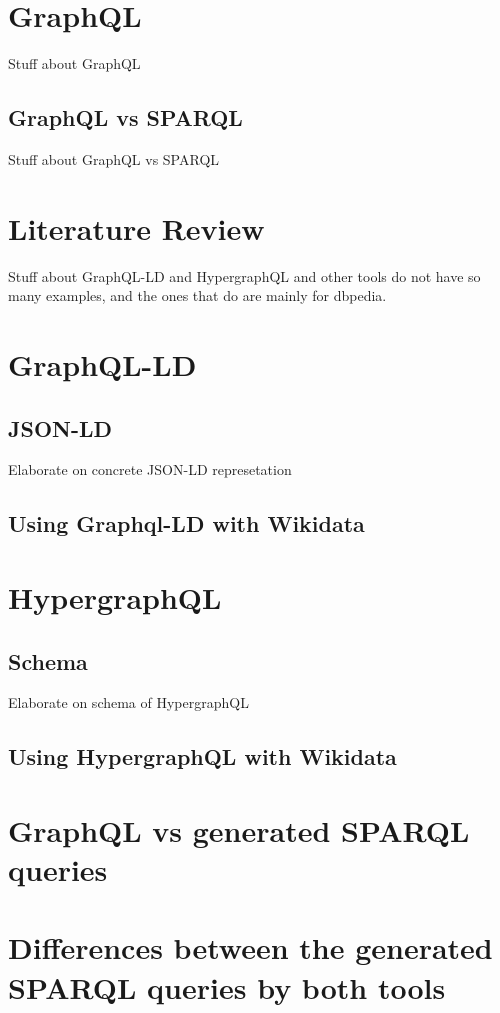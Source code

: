 \documentclass[12 pt, a4paper]{report}
\theoremstyle{definition}
\begin{document}
{\section{GraphQL}
Stuff about GraphQL
\subsection{GraphQL vs SPARQL}
Stuff about GraphQL vs SPARQL


\section{Literature Review}

Stuff about GraphQL-LD and HypergraphQL and other tools do not have so many examples, and the ones that do are mainly for dbpedia.

\section{GraphQL-LD}
\subsection{JSON-LD}
Elaborate on concrete JSON-LD represetation
\subsection{Using Graphql-LD with Wikidata}

\section{HypergraphQL}
\subsection{Schema}
Elaborate on schema of HypergraphQL
\subsection{Using HypergraphQL with Wikidata}

\section{GraphQL vs generated SPARQL queries}

\section{Differences between the generated SPARQL queries by both tools}

}
\end{document}

